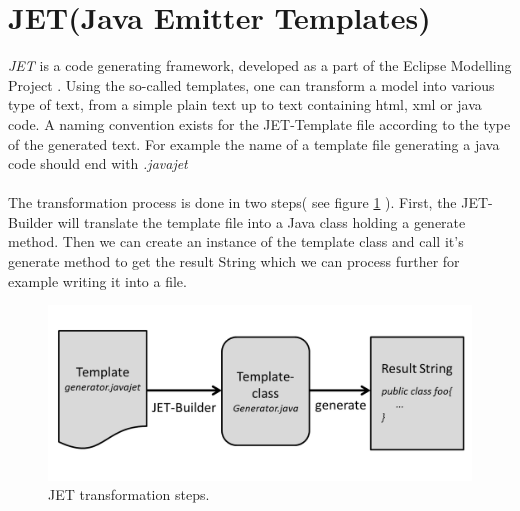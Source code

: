 \newpage

\section{JET(Java Emitter Templates)}
\textit{JET}\cite{JETWEB} is a code generating framework, developed as a part of the Eclipse Modelling Project \cite{EMPWEB}. Using the so-called templates, one can transform a model into various type of text, from a simple plain text up to text containing html, xml or java code. A naming convention exists for the JET-Template file according to the type of the generated text. For example the name of a template file generating a java code should end with \textit{.javajet}\\\\
The transformation process is done in two steps( see figure \ref{fig:jet_process} ). First, the JET-Builder will translate the template file into a Java class holding a generate method. Then we can create an instance of the template class and call it's generate method to get the result String which we can process further for example writing it into a file. 
\begin{figure}[h]
  \label{fig:jet_process}
	\centering
		\includegraphics[width=1.0\textwidth]{images/jet_process.png}
	\caption{JET transformation steps.}
\end{figure}\\

